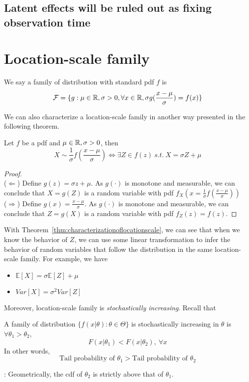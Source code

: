\documentclass[../Distributions.tex]{subfiles}
\begin{document}
\subsection{Latent effects will be ruled out as fixing observation time}

\section{Location-scale family}
\begin{definition}
	We say a family of distribution with standard pdf $f$ is $$\mathcal{F} = \{g: \mu\in{\mathbb R}, \sigma>0, \forall x\in{\mathbb R}, \sigma g(\frac{x-\mu}{\sigma}) = f(x)\}$$
\end{definition}
We can also characterize a location-scale family in another way presented in the following theorem.
\begin{theorem}\label{thm:characterizationoflocationscale}
	Let $f$ be a pdf and $\mu\in{\mathbb R},\sigma>0$, then
	$$X\sim\frac{1}{\sigma}f(\frac{x-\mu}{\sigma})\Leftrightarrow\exists Z\in f(z)\ s.t.\ X = \sigma Z+\mu$$
\end{theorem}
\begin{proof}\\
	($\Leftarrow$) Define $g(z) = \sigma z+\mu$. As $g(\cdot)$ is monotone and measurable, we can conclude that $X = g(Z)$ is a random variable with pdf $f_X(x = \frac{1}{\sigma}f(\frac{x-\mu}{\sigma}))$\\
	($\Rightarrow$) Define $g(x) = \frac{x-\mu}{\sigma}$. As $g(\cdot)$ is monotone and measurable, we can conclude that $Z = g(X)$ is a random variable with pdf $f_Z(z) = f(z)$.
\end{proof}

With Theorem~\ref{thm:characterizationoflocationscale}, we can see that when we know the behavior of $Z$, we can use some linear transformation to infer the behavior of random variables that follow the distribution in the same location-scale family. For example, we have
\begin{itemize}
	\item $\mathbb{E}[X] = \sigma\mathbb{E}[Z]+\mu$
	\item $Var[X] = \sigma^2Var[Z]$
\end{itemize}

Moreover, location-scale family is {\it stochastically increasing}. Recall that
\begin{definition}
	A family of distribution $\{f(x|\theta):\theta\in\Theta\}$ is stochastically increasing in $\theta$ is $\forall\theta_1>\theta_2$,
	$$F(x|\theta_1)<F(x|\theta_2),\ \forall x$$
	In other words,
	$$\mbox{Tail probability of $\theta_1$} > \mbox{Tail probability of $\theta_2$}$$
\end{definition}
: Geometrically, the cdf of $\theta_2$ is strictly above that of $\theta_1$.
\end{document}
